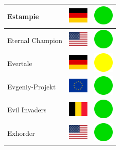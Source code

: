 \documentclass[12pt, a4paper, twoside]{report}
\begin{document}
\begin{center}
\begin{longtable}{|p{5cm}|p{2cm}|p{2cm}|}
 Estampie                                                   & \includegraphics[width=1cm]{../img/flags/de} &   \includegraphics[width=1cm]{../likes/y} \\ \hline
 Eternal Champion                                           & \includegraphics[width=1cm]{../img/flags/us} &   \includegraphics[width=1cm]{../likes/y} \\ \hline
 Evertale                                                   & \includegraphics[width=1cm]{../img/flags/de} &   \includegraphics[width=1cm]{../likes/m} \\ \hline
 Evgeniy-Projekt                                            & \includegraphics[width=1cm]{../img/flags/eu} &   \includegraphics[width=1cm]{../likes/y} \\ \hline
 Evil Invaders                                              & \includegraphics[width=1cm]{../img/flags/be} &   \includegraphics[width=1cm]{../likes/y} \\ \hline
 Exhorder                                                   & \includegraphics[width=1cm]{../img/flags/us} &   \includegraphics[width=1cm]{../likes/y} \\ \hline

\end{longtable}
\end{center}
\end{document}
